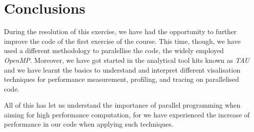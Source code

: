 \section{Conclusions}

During the resolution of this exercise, we have had the opportunity to further improve the code of the first exercise of the course. This time, though, we have used a different methodology to paralellise the code, the widely employed \emph{OpenMP}. Moreover, we have got started in the analytical tool kits known as \emph{TAU} and we have learnt the basics to understand and interpret different visalisation techniques for performance measurement, profiling, and tracing on parallelised code.

All of this has let us understand the importance of parallel programming when aiming for high performance computation, for we have experienced the increase of performance in our code when applying such techniques.
